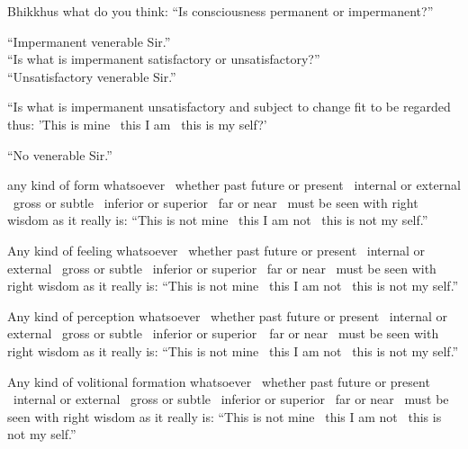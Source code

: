 \begin{english-only-nohang}
Bhikkhus what do you think: ``Is consciousness permanent or impermanent?''

``Impermanent venerable Sir.''\\

``Is what is impermanent satisfactory or unsatisfactory?''\\

``Unsatisfactory venerable Sir.''\\

\begin{english-hangtogether}
``Is what is impermanent unsatisfactory and subject to change fit to be regarded thus: 'This is mine \breathmark\ this I am \breathmark\ this is my self?'
\end{english-hangtogether}

``No venerable Sir.''
\end{english-only-nohang}

\begin{english-only-hang}
 any kind of form whatsoever \breathmark\ whether past future or present \breathmark\ internal or external \breathmark\ gross or subtle \breathmark\ inferior or superior \breathmark\ far or near \breathmark\ must be seen with right wisdom as it really is: ``This is not mine \breathmark\ this I am not \breathmark\ this is not my self.''
\end{english-only-hang}

\begin{english-only-hang}
Any kind of feeling whatsoever \breathmark\ whether past future or present \breathmark\ internal or external \breathmark\ gross or subtle \breathmark\ inferior or superior \breathmark\ far or near \breathmark\ must be seen with right wisdom as it really is: ``This is not mine \breathmark\ this I am not \breathmark\ this is not my self.''
\end{english-only-hang}

\begin{english-only-hang}
Any kind of perception whatsoever \breathmark\ whether past future or present \breathmark\ internal or external \breathmark\ gross or subtle \breathmark\ inferior or \mbox{superior}~\breathmark\ far or near \breathmark\ must be seen with right wisdom as it really is: ``This is not mine \breathmark\ this I am not \breathmark\ this is not my self.''
\end{english-only-hang}

\begin{english-only-hang}
Any kind of volitional formation whatsoever \breathmark\ whether past future or present \breathmark\ internal or external \breathmark\ gross or subtle \breathmark\ inferior or superior \breathmark\ far or near \breathmark\ must be seen with right wisdom as it really is: ``This is not mine \breathmark\ this I am not \breathmark\ this is not my self.''
\end{english-only-hang}

